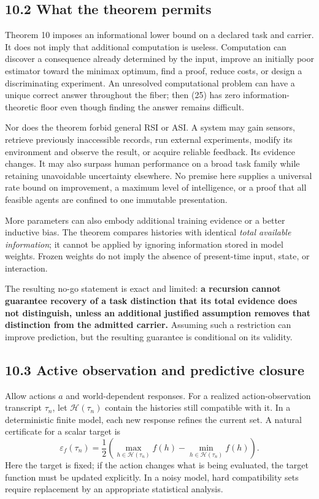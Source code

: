 \documentclass[
]{article}
\begin{document}
\subsection{10.2 What the theorem permits}\label{what-the-theorem-permits}

Theorem 10 imposes an informational lower bound on a declared task and carrier. It does not imply that additional computation is useless. Computation can discover a consequence already determined by the input, improve an initially poor estimator toward the minimax optimum, find a proof, reduce costs, or design a discriminating experiment. An unresolved computational problem can have a unique correct answer throughout the fiber; then (25) has zero information-theoretic floor even though finding the answer remains difficult.

Nor does the theorem forbid general RSI or ASI. A system may gain sensors, retrieve previously inaccessible records, run external experiments, modify its environment and observe the result, or acquire reliable feedback. Its evidence changes. It may also surpass human performance on a broad task family while retaining unavoidable uncertainty elsewhere. No premise here supplies a universal rate bound on improvement, a maximum level of intelligence, or a proof that all feasible agents are confined to one immutable presentation.

More parameters can also embody additional training evidence or a better inductive bias. The theorem compares histories with identical \emph{total available information}; it cannot be applied by ignoring information stored in model weights. Frozen weights do not imply the absence of present-time input, state, or interaction.

The resulting no-go statement is exact and limited: \textbf{a recursion cannot guarantee recovery of a task distinction that its total evidence does not distinguish, unless an additional justified assumption removes that distinction from the admitted carrier.} Assuming such a restriction can improve prediction, but the resulting guarantee is conditional on its validity.

\subsection{10.3 Active observation and predictive closure}\label{active-observation-and-predictive-closure}

Allow actions \(a\) and world-dependent responses. For a realized action-observation transcript \(\tau_n\), let \(\mathcal H(\tau_n)\) contain the histories still compatible with it. In a deterministic finite model, each new response refines the current set. A natural certificate for a scalar target is
\[
\varepsilon_f(\tau_n)
=\frac12\left(\max_{h\in\mathcal H(\tau_n)}f(h)
                   -\min_{h\in\mathcal H(\tau_n)}f(h)\right).
\tag{27}
\]
Here the target is fixed; if the action changes what is being evaluated, the target function must be updated explicitly. In a noisy model, hard compatibility sets require replacement by an appropriate statistical analysis.
\end{document}
